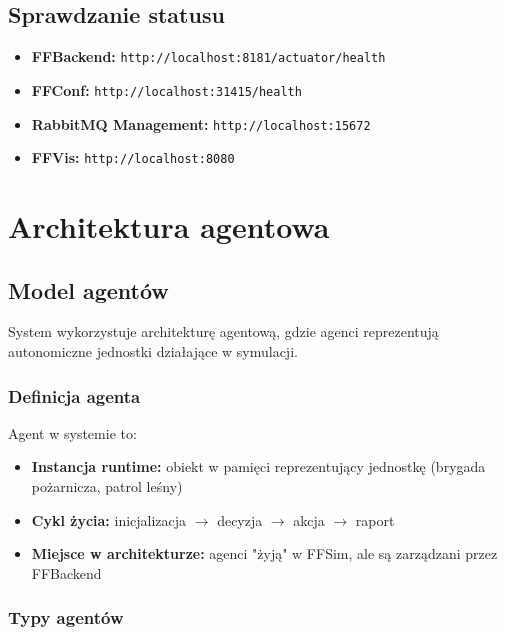 \documentclass[11pt,a4paper]{article}
\begin{document}
\subsection{Sprawdzanie statusu}

\begin{itemize}
    \item \textbf{FFBackend:} \texttt{http://localhost:8181/actuator/health}
    \item \textbf{FFConf:} \texttt{http://localhost:31415/health}
    \item \textbf{RabbitMQ Management:} \texttt{http://localhost:15672}
    \item \textbf{FFVis:} \texttt{http://localhost:8080}
\end{itemize}

\section{Architektura agentowa}

\subsection{Model agentów}

System wykorzystuje architekturę agentową, gdzie agenci reprezentują autonomiczne jednostki działające w symulacji.

\subsubsection{Definicja agenta}

Agent w systemie to:
\begin{itemize}
    \item \textbf{Instancja runtime:} obiekt w pamięci reprezentujący jednostkę (brygada pożarnicza, patrol leśny)
    \item \textbf{Cykl życia:} inicjalizacja $\rightarrow$ decyzja $\rightarrow$ akcja $\rightarrow$ raport
    \item \textbf{Miejsce w architekturze:} agenci "żyją" w FFSim, ale są zarządzani przez FFBackend
\end{itemize}

\subsubsection{Typy agentów}
\end{document}
